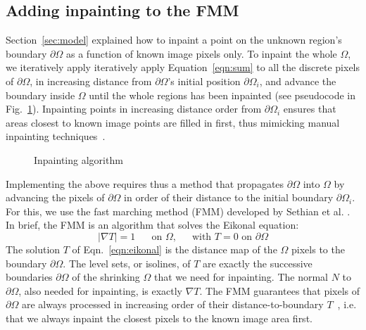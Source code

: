 \documentclass{llncs}
\begin{document}
\subsection{Adding inpainting to the FMM}
\label{sec:fmm}
%
%
 Section~\ref{sec:model} explained how to inpaint
a point on the unknown region's boundary $\partial\Omega$ as a function of
known image pixels only. To inpaint the whole $\Omega$, we iteratively apply
iteratively apply Equation~\ref{eqn:sum} to all the discrete pixels of
$\partial\Omega$, in increasing distance from $\partial\Omega$'s initial
position $\partial\Omega_i$, and advance the boundary inside $\Omega$ until the whole
regions has been inpainted (see pseudocode in Fig.~\ref{fig:pseudo}). 
Inpainting points in increasing
distance order from $\partial\Omega_i$ ensures that areas closest to known
image points are filled in first, thus mimicking manual inpainting
techniques~\cite{bertalmio1,bertalmio2}. 
%
	\begin{figure}[h] \centering
	\caption{Inpainting algorithm}
	\label{fig:pseudo} 
        \end{figure} 
%

Implementing the above requires thus a method that propagates
$\partial\Omega$ into $\Omega$ by advancing the pixels of $\partial\Omega$
in order of their distance to the initial boundary $\partial\Omega_i$. 
For this, we use the fast marching method (FMM) developed by Sethian et al.
\cite{sethian}. In brief, the FMM is an algorithm that solves the Eikonal equation:
%
%
\begin{equation}
   |\nabla T| = 1 \mbox{~~~~~on $\Omega$,~~~~~with $T=0$ on $\partial\Omega$}
\label{eqn:eikonal}
\end{equation}
%
The solution $T$ of Eqn.~\ref{eqn:eikonal} is the distance map of the $\Omega$ pixels to the boundary
$\partial\Omega$. The level sets, or isolines, of $T$ 
are exactly the successive boundaries $\partial\Omega$ of the shrinking
$\Omega$ that we need for inpainting. The normal $N$ to
$\partial\Omega$, also needed for inpainting, is exactly $\nabla T$. The FMM
guarantees that pixels of $\partial\Omega$ are always processed in
increasing order of their distance-to-boundary $T$~\cite{fmm_book}, i.e.
that we always inpaint the closest pixels to the known image area first. 
\end{document}
